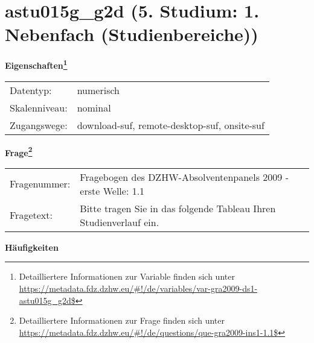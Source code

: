 
    \setcounter{footnote}{0}

    \vspace*{-1.8cm}
	\section{astu015g\_g2d (5. Studium: 1. Nebenfach (Studienbereiche))}
	\label{section:astu015g_g2d}



    \vspace*{0.5cm}
    \noindent\textbf{Eigenschaften\footnote{Detailliertere Informationen zur Variable finden sich unter
		\url{https://metadata.fdz.dzhw.eu/\#!/de/variables/var-gra2009-ds1-astu015g_g2d$}}}\\
	\begin{tabularx}{\hsize}{@{}lX}
	Datentyp: & numerisch \\
	Skalenniveau: & nominal \\
	Zugangswege: &
	  download-suf, 
	  remote-desktop-suf, 
	  onsite-suf
 \\
    \end{tabularx}



				\vspace*{0.5cm}
                \noindent\textbf{Frage\footnote{Detailliertere Informationen zur Frage finden sich unter
		              \url{https://metadata.fdz.dzhw.eu/\#!/de/questions/que-gra2009-ins1-1.1$}}}\\
				\begin{tabularx}{\hsize}{@{}lX}
					Fragenummer: &
					  Fragebogen des DZHW-Absolventenpanels 2009 - erste Welle:
					  1.1
 \\
					Fragetext: & Bitte tragen Sie in das folgende Tableau Ihren Studienverlauf ein. \\
				\end{tabularx}





        		\vspace*{0.5cm}
                \noindent\textbf{Häufigkeiten}


